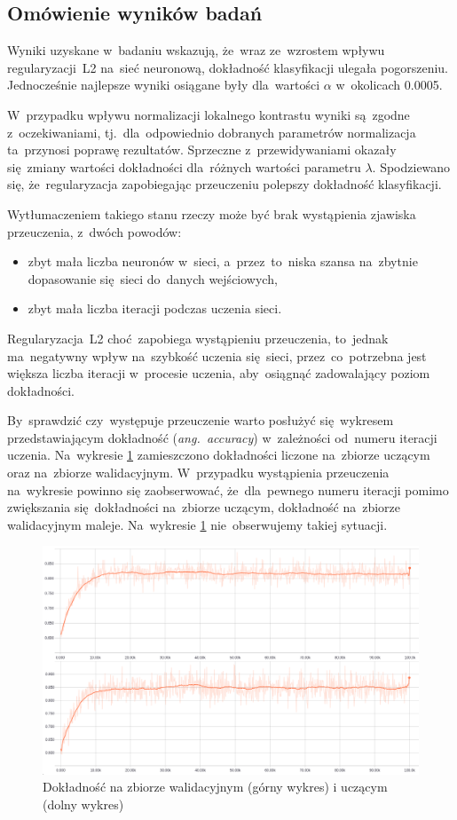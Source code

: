 \subsection{Omówienie wyników badań}
Wyniki uzyskane w~badaniu wskazują, że~wraz ze~wzrostem wpływu regularyzacji~L2 na~sieć neuronową, dokładność
klasyfikacji ulegała pogorszeniu. Jednocześnie najlepsze wyniki osiągane były dla~wartości $\alpha$ w~okolicach 0.0005.

W~przypadku wpływu normalizacji lokalnego kontrastu wyniki są~zgodne z~oczekiwaniami, tj.~dla~odpowiednio dobranych
parametrów normalizacja ta~przynosi poprawę rezultatów. Sprzeczne z~przewidywaniami okazały się~zmiany wartości
dokładności dla~różnych wartości parametru $\lambda$. Spodziewano się, że~regularyzacja zapobiegając przeuczeniu
polepszy dokładność klasyfikacji.

Wytłumaczeniem takiego stanu rzeczy może być brak wystąpienia zjawiska przeuczenia, z~dwóch powodów:
\begin{itemize}
    \item zbyt mała liczba neuronów w~sieci, a~przez~to~niska szansa na~zbytnie dopasowanie się~sieci do~danych
          wejściowych,
    \item zbyt mała liczba iteracji podczas uczenia sieci.
\end{itemize}
Regularyzacja~L2 choć~zapobiega wystąpieniu przeuczenia, to~jednak ma~negatywny wpływ na~szybkość uczenia się~sieci,
przez~co~potrzebna jest większa liczba iteracji w~procesie uczenia, aby~osiągnąć zadowalający poziom dokładności.

By~sprawdzić czy~występuje przeuczenie warto posłużyć się~wykresem przedstawiającym dokładność (\textit{ang.~accuracy})
w~zależności od~numeru iteracji uczenia. Na~wykresie \ref{rys:badanie-1} zamieszczono
dokładności liczone na~zbiorze uczącym oraz na~zbiorze walidacyjnym. W~przypadku wystąpienia przeuczenia na~wykresie
powinno się zaobserwować, że~dla~pewnego numeru iteracji pomimo zwiększania się~dokładności na~zbiorze uczącym,
dokładność na~zbiorze walidacyjnym maleje. Na~wykresie \ref{rys:badanie-1} nie~obserwujemy takiej sytuacji.

\begin{figure}[H]
	\centering
	\includegraphics[width=\linewidth]{img/badanie_1.png}
	\caption{Dokładność na zbiorze walidacyjnym (górny wykres) i uczącym (dolny wykres)}
	\label{rys:badanie-1}
\end{figure}

